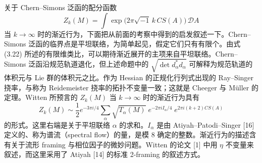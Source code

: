 关于 Chern--Simons 泛函的配分函数
\[
  Z_{k}(M)=\int\exp\bigl(2\pi\sqrt{-1}\,k\,CS(A)\bigr)\,\mathcal{D}A
\]
当 $k\to\infty$ 时的渐近行为，下面把从前面的考察中得到的启发叙述一下。Chern--Simons 泛函的临界点是平坦联络，为简单起见，假定它们只有有限个。由式 (3.22) 所述的有限维类比，可以期待渐近展开的主项来自平坦联络。Chern--Simons 泛函沿规范轨道退化，但上述命题中的 $\sqrt{\det d^{*}_{\alpha}d_{\alpha}}$ 可解释为规范轨道的体积元与 Lie 群的体积元之比。作为 Hessian 的正规化行列式出现的 Ray--Singer 挠率，与称为 Reidemeister 挠率的拓扑不变量一致；这就是 Cheeger 与 Müller 的定理。Witten 所预言的 $Z_{k}(M)$ 当 $k\to\infty$ 时的渐近行为具有
\[
  Z_{k}(M)\sim\frac{1}{2}e^{-3\pi i/4}
  \sum_{\alpha}\sqrt{T_{\alpha}(M)}\;
  e^{-2\pi i I_{\alpha}/4}\;
  e^{2\pi i(k+2)CS(A)}
\]
的形式。这里右端是关于平坦联络 $\alpha$ 的求和。$I_{\alpha}$ 是由 Atiyah--Patodi--Singer [16] 定义的、称为谱流（spectral flow）的量，是模 $8$ 确定的整数。渐近行为的描述含有关于流形 framing 与相位因子的微妙问题。Witten 的论文 [1] 中用 $\eta$ 不变量来叙述，而这里采用了 Atiyah [14] 的标准 2-framing 的叙述方式。


